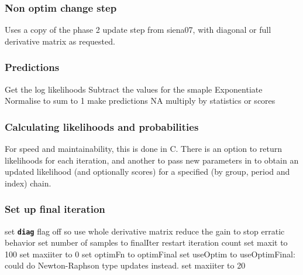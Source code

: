 \documentclass[12pt, a4paper]{article}
\renewcommand{\=}{\,=\,}
\newcommand{\+}{\,+\,}
\newcommand{\sfn}[1]{\textbf{\texttt{#1}}}
\begin{document}
\subsubsection{Non optim change step}
\label{sec:algchange}
\begin{algorithmic}
\STATE Uses a copy of the phase 2 update step from siena07, with diagonal or full
derivative matrix as requested.
\end{algorithmic}
\subsubsection{Predictions}
\label{sec:pred}
\begin{algorithmic}
\STATE Get the log likelihoods
\STATE Subtract the values for the smaple
\STATE Exponentiate
\STATE Normalise to sum to 1
\STATE make predictions NA
\ELSE
\STATE multiply by statistics or scores
\ENDIF
\end{algorithmic}
\subsubsection{Calculating likelihoods and probabilities}
For speed and maintainability, this is done in C. There is an option to return
likelihoods for each iteration, and another to pass new parameters in to obtain
an updated likelihood (and optionally scores) for a specified (by group, period
and index) chain.
\subsubsection{Set up final iteration}
\label{sec:final}
\begin{algorithmic}
\STATE set \sfn{diag} flag off so use whole derivative matrix
\STATE reduce the gain to stop erratic behavior
\STATE set number of samples to finalIter
\STATE restart iteration count
\STATE set maxit to 100
\STATE set maxiiter to 0
\STATE set optimFn to optimFinal
\STATE set useOptim to useOptimFinal: could do Newton-Raphson type updates
instead.
\ELSE
\STATE set maxiiter to 20
\ENDIF
\end{algorithmic}
\end{document}

